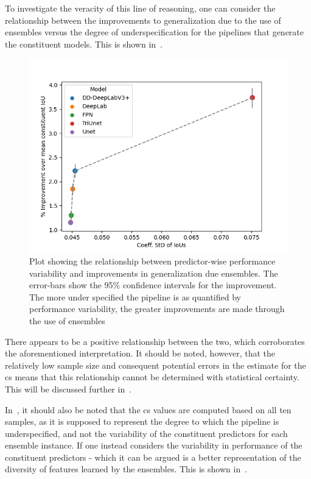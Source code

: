 To investigate the veracity of this line of reasoning, one can consider the relationship between the improvements to generalization due to the use of ensembles versus the degree of underspecification for the pipelines that generate the constituent models. This is shown in~. 
\begin{figure}[htb]
    \centering
    \includegraphics[width=0.75\linewidth]{illustrations/ensembles_underspecification.png}
    \caption[Relationship between ensemble improvements and underspecification]{Plot showing the relationship between predictor-wise performance variability and improvements in generalization due ensembles. The error-bars show the 95\% confidence intervals for the improvement. The more under specified the pipeline is as quantified by performance variability, the greater improvements are made through the use of ensembles}
    \label{fig:ensemble_var}
\end{figure}

There appears to be a positive relationship between the two, which corroborates the aforementioned interpretation. It should be noted, however, that the relatively low sample size and consequent potential errors in the estimate for the \gls{cs} means that this relationship cannot be determined with statistical certainty. This will be discussed further in~. 

In~, it should also be noted that the \gls{cs} values are computed based on all ten samples, as it is supposed to represent the degree to which the pipeline is underspecified, and not the variability of the constituent predictors for each ensemble instance. If one instead considers the variability in performance of the constituent predictors - which it can be argued is a better representation of the diversity of features learned by the ensembles. This is shown in~.

